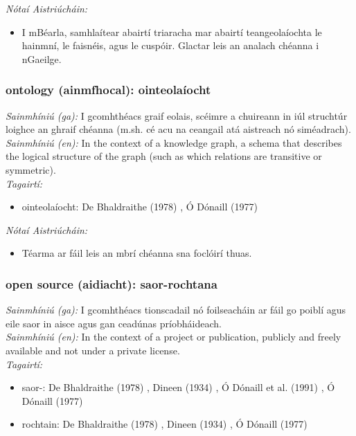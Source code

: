  \noindent \textit{Nótaí Aistriúcháin:}
\begin{itemize}
	\item I mBéarla, samhlaítear abairtí triaracha mar abairtí teangeolaíochta le hainmní, le faisnéis, agus le cuspóir. Glactar leis an analach chéanna i nGaeilge.
\end{itemize}


\subsubsection*{ontology (ainmfhocal): ointeolaíocht}
 \noindent \textit{Sainmhíniú (ga):} I gcomhthéacs graif eolais, scéimre a chuireann in iúl struchtúr loighce an ghraif chéanna (m.sh. cé acu na ceangail atá aistreach nó siméadrach).
\\
 \noindent \textit{Sainmhíniú (en):} In the context of a knowledge graph, a schema that describes the logical structure of the graph (such as which relations are transitive or symmetric).
\\
 \noindent \textit{Tagairtí:}
\begin{itemize}
	\item ointeolaíocht: De Bhaldraithe (1978) \cite{de-bhaldraithe}, Ó Dónaill (1977) \cite{odonaill}
\end{itemize}

 \noindent \textit{Nótaí Aistriúcháin:}
\begin{itemize}
	\item Téarma ar fáil leis an mbrí chéanna sna foclóirí thuas.
\end{itemize}


\subsubsection*{open source (aidiacht): saor-rochtana}
 \noindent \textit{Sainmhíniú (ga):} I gcomhthéacs tionscadail nó foilseacháin ar fáil go poiblí agus eile saor in aisce agus gan ceadúnas príobháideach.
\\
 \noindent \textit{Sainmhíniú (en):} In the context of a project or publication, publicly and freely available and not under a private license.
\\
 \noindent \textit{Tagairtí:}
\begin{itemize}
	\item saor-: De Bhaldraithe (1978) \cite{de-bhaldraithe}, Dineen (1934) \cite{dineen}, Ó Dónaill et al. (1991) \cite{focloir-beag}, Ó Dónaill (1977) \cite{odonaill}
	\item rochtain: De Bhaldraithe (1978) \cite{de-bhaldraithe}, Dineen (1934) \cite{dineen}, Ó Dónaill (1977) \cite{odonaill}
\end{itemize}

